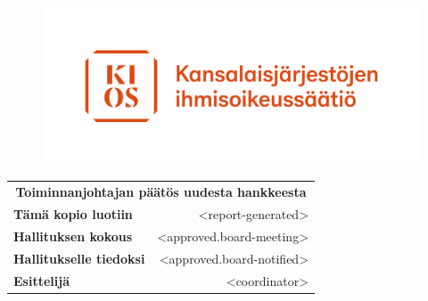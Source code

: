 \documentclass[twoside,a4paper]{article}
\begin{document}
    \setcounter{page}{0}
	\begin{figure}
		\includegraphics[trim = 10mm 0mm 0mm 70mm,scale=0.25]{logo.pdf}
	\end{figure}
	
	\hfill
	\begin{tabular}{l r}
		\multicolumn{2}{c}{
		    \textbf{Toiminnanjohtajan päätös uudesta hankkeesta}
		}\\ 
		\textbf{Tämä kopio luotiin} & <report-generated>\\ 
		\textbf{Hallituksen kokous} & <approved.board-meeting>\\  
		\textbf{Hallitukselle tiedoksi} & <approved.board-notified>\\  
		\textbf{Esittelijä} & <coordinator>\\ 
	\end{tabular}
	
\end{document}
